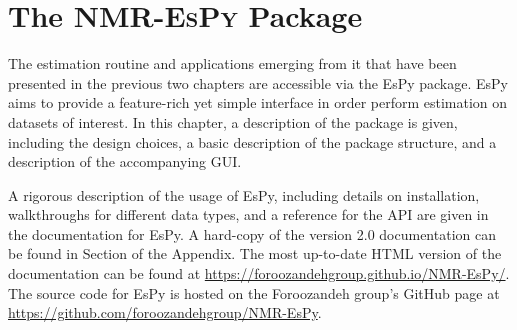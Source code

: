 \chapter{The \textsc{NMR-EsPy} Package}
\label{chap:nmrespy}

The estimation routine and applications emerging from it that have been
presented in the previous two chapters are accessible via the \ac{EsPy}
package. \ac{EsPy} aims to provide a feature-rich yet simple interface in order
perform estimation on datasets of interest. In this chapter, a description of
the package is given, including the design choices, a basic description of the
package structure, and a description of the accompanying \ac{GUI}.

A rigorous description of the usage of \ac{EsPy}, including details on
installation, walkthroughs for different data types, and a reference for the
\ac{API} are given in the documentation for \ac{EsPy}. A hard-copy of the
version 2.0 documentation can be found in Section  of the Appendix.
The most up-to-date HTML version of the documentation can be found at
\url{https://foroozandehgroup.github.io/NMR-EsPy/}.
The source code for \ac{EsPy} is hosted on the Foroozandeh group's GitHub page at
\url{https://github.com/foroozandehgroup/NMR-EsPy}.


